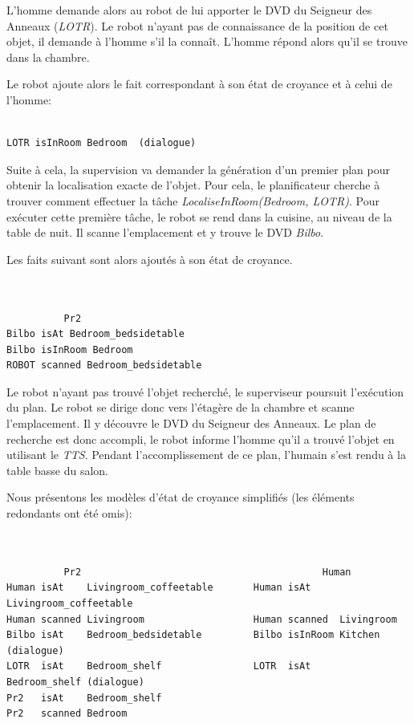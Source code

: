 \documentclass[a4paper,11pt,twoside]{StyleThese}
\begin{document}
L'homme demande alors au robot de lui apporter le DVD du Seigneur des Anneaux (\textit{LOTR}).
Le robot n'ayant pas de connaissance de la position de cet objet, il demande à l'homme s'il la connaît.
L'homme répond alors qu'il se trouve dans la chambre.

Le robot ajoute alors le fait correspondant à son état de croyance et à celui de l'homme:

\begin{scriptsize}
\begin{verbatim}

LOTR isInRoom Bedroom  (dialogue)

\end{verbatim}
\end{scriptsize}

Suite à cela, la supervision va demander la génération d'un premier plan pour obtenir la localisation exacte de l'objet. Pour cela, le planificateur cherche à trouver comment effectuer la tâche \textit{LocaliseInRoom(Bedroom, LOTR)}.
Pour exécuter cette première tâche, le robot se rend dans la cuisine, au niveau de la table de nuit. Il scanne l'emplacement et y trouve le DVD \textit{Bilbo}.

Les faits suivant sont alors ajoutés à son état de croyance.

\begin{scriptsize}
\begin{verbatim}


          Pr2
Bilbo isAt Bedroom_bedsidetable
Bilbo isInRoom Bedroom
ROBOT scanned Bedroom_bedsidetable

\end{verbatim}
\end{scriptsize}

Le robot n'ayant pas trouvé l'objet recherché, le superviseur poursuit l'exécution du plan. Le robot se dirige donc vers l'étagère de la chambre et scanne l'emplacement.
Il y découvre le DVD du Seigneur des Anneaux.
Le plan de recherche est donc accompli, le robot informe l'homme qu'il a trouvé l'objet en utilisant le \textit{TTS}.
Pendant l'accomplissement de ce plan, l'humain s'est rendu à la table basse du salon.

Nous présentons les modèles d'état de croyance simplifiés (les éléments redondants ont été omis):

\begin{scriptsize}
\begin{verbatim}


          Pr2                                          Human
Human isAt    Livingroom_coffeetable       Human isAt     Livingroom_coffeetable
Human scanned Livingroom                   Human scanned  Livingroom
Bilbo isAt    Bedroom_bedsidetable         Bilbo isInRoom Kitchen (dialogue)
LOTR  isAt    Bedroom_shelf                LOTR  isAt     Bedroom_shelf (dialogue)
Pr2   isAt    Bedroom_shelf                
Pr2   scanned Bedroom

\end{verbatim}
\end{scriptsize}
\end{document}
